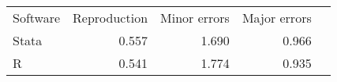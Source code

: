 \begin{tabular}{lrrrr}
\hline\hline
Software & Reproduction & Minor errors & Major errors \\
Stata & 0.557 & 1.690 & 0.966 \\
R & 0.541 & 1.774 & 0.935 \\
\hline\hline
\end{tabular}
